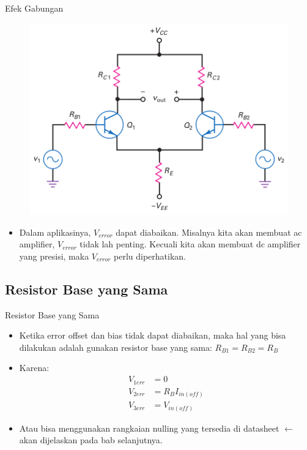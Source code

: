 \documentclass[aspectratio=169]{beamer}
\begin{document}
\begin{frame}{Efek Gabungan}
	\begin{multicols}{2}
		\begin{figure}
			\centering
			\includegraphics[height=0.6\textheight]{gambar/01.diff-amp/01.output_of_diff_amp_includes_desired_signal_and_error_voltage}
		\end{figure}
		\columnbreak
		\begin{itemize}
			\item Dalam aplikasinya, $ V_{error} $ dapat diabaikan. Misalnya kita akan membuat ac amplifier, $ V_{error} $ tidak lah penting. Kecuali kita akan membuat dc amplifier yang presisi, maka $ V_{error} $ perlu diperhatikan.
		\end{itemize}
	\end{multicols}
\end{frame}

\subsection{Resistor Base yang Sama}
\begin{frame}{Resistor Base yang Sama}
	\begin{itemize}
		\item Ketika error offset dan bias tidak dapat diabaikan, maka hal yang bisa dilakukan adalah gunakan resistor base yang sama: $ R_{B1} = R_{B2} = R_{B}$
		\item Karena:
		\begin{align*}
			V_{1err} &= 0 \\
			V_{2err} &= R_B I_{in(off)} \\
			V_{3err} &= V_{in(off)}
		\end{align*}
		\item Atau bisa menggunakan rangkaian nulling yang tersedia di datasheet $ \leftarrow $ akan dijelaskan pada bab selanjutnya.
	\end{itemize}
\end{frame}
\end{document}
